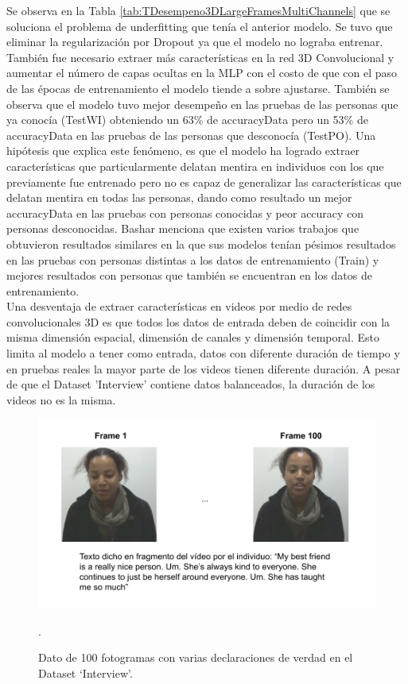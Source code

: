 \begin{onehalfspacing}
Se observa en la Tabla \ref{tab:TDesempeno3DLargeFramesMultiChannels} que se soluciona el problema de underfitting que tenía el anterior modelo. Se tuvo que eliminar la regularización por Dropout ya que el modelo no lograba entrenar. También fue necesario extraer más características en la red 3D Convolucional y aumentar el número de capas ocultas en la MLP con el costo de que con el paso de las épocas de entrenamiento el modelo tiende a sobre ajustarse. También se observa que el modelo tuvo mejor desempeño en las pruebas de las personas que ya conocía (TestWI) obteniendo un 63\% de accuracyData pero un 53\% de accuracyData en las pruebas de las personas que desconocía (TestPO). Una hipótesis que explica este fenómeno, es que el modelo ha logrado extraer características que particularmente delatan mentira en individuos con los que previamente fue entrenado pero no es capaz de generalizar las características que delatan mentira en todas las personas, dando como resultado un mejor accuracyData en las pruebas con personas conocidas y peor accuracy con personas desconocidas. Bashar \cite{Rajoub2014ThermalDetection} menciona que existen varios trabajos que obtuvieron resultados similares en la que sus modelos tenían pésimos resultados en las pruebas con personas distintas a los datos de entrenamiento (Train) y mejores resultados con personas que también se encuentran en los datos de entrenamiento. \\

Una desventaja de extraer características en videos por medio de redes convolucionales 3D es que todos los datos de entrada deben de coincidir con la misma dimensión espacial, dimensión de canales y dimensión temporal. Esto limita al modelo a tener como entrada, datos con diferente duración de tiempo y en pruebas reales la mayor parte de los videos tienen diferente duración. A pesar de que el Dataset 'Interview' contiene datos balanceados, la duración de los videos no es la misma.\\

\begin{figure}[h!]
	\centering
	\includegraphics[width=14cm,keepaspectratio]{XX_Figures/TextoFragmento100FramesD2.png}
	\caption{\footnotesize Dato de 100 fotogramas con varias declaraciones de verdad en el Dataset `Interview'.}.
	\label{fig:TextoFragmento100FramesD2}
\end{figure}


\end{onehalfspacing}

